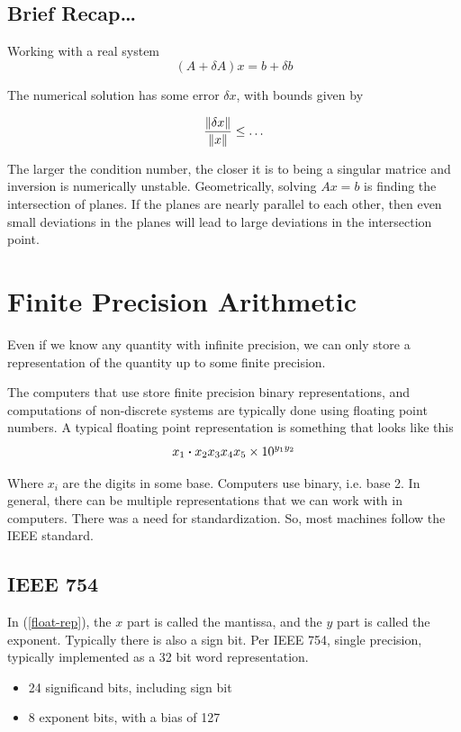 \subsection*{Brief Recap\ldots}
Working with a real system
\begin{equation}
    (A + \delta A)x = b + \delta b 
\end{equation}

The numerical solution has some error $\delta x$, with bounds given
by

\begin{equation}
    \frac{\norm{\delta x}}{\norm{x}} \le \ldots
\end{equation}  

The larger the condition number, the closer it is to being a singular
matrice and inversion is numerically unstable. Geometrically, solving
$Ax = b$ is finding the intersection of planes. If the planes are
nearly parallel to each other, then even small deviations in the
planes will lead to large deviations in the intersection point.

\section*{Finite Precision Arithmetic}
Even if we know any quantity with infinite precision, we can only
store a representation of the quantity up to some finite precision.

The computers that use store finite precision binary representations,
and computations of non-discrete systems are typically done using
floating point numbers. A typical floating point representation
is something that looks like this
\begin{equation}
    \label{float-rep}
    x_1\vdot x_2x_3x_4x_5 \times 10^{y_1y_2}
\end{equation}

Where $x_i$ are the digits in some base. Computers use binary, i.e.
base 2. In general, there can be multiple representations that
we can work with in computers. There was a need for standardization.
So, most machines follow the IEEE standard.

\subsection*{IEEE 754}
In (\ref{float-rep}), the $x$ part is called the mantissa, and the
 $y$ part is called the exponent. Typically there is also a sign bit.
Per IEEE 754, single precision, typically implemented as a 32 bit
word representation.
\begin{itemize}
    \item 24 significand bits, including sign bit
    \item 8 exponent bits, with a bias of 127
\end{itemize}

